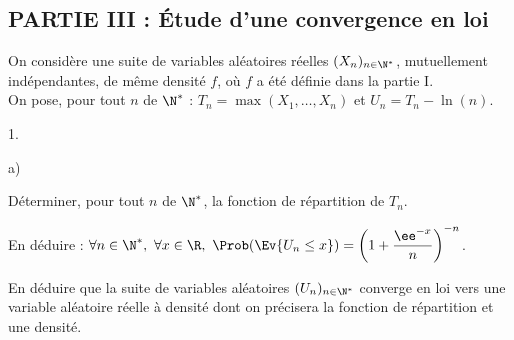 

\subsection*{PARTIE III : Étude d'une convergence en loi}

\noindent
On considère une suite de variables aléatoires réelles $(X_n)_{n\in
  \N^*}$, mutuellement indépendantes, de même densité $f$, où $f$ a
été définie dans la partie I.\\
On pose, pour tout $n$ de $\N^*$ : $T_n=\max(X_1,\ldots,X_n)$ et
$U_n=T_n-\ln(n)$.

\begin{noliste}{1.}
  \setlength{\itemsep}{4mm}
  \setcounter{enumi}{9}
\item
  \begin{noliste}{a)}
  \setlength{\itemsep}{2mm}
  \item Déterminer, pour tout $n$ de $\N^*$, la fonction de
    répartition de $T_n$.

    
    
  \item En déduire : $\forall n\in \N^*, \ \forall x\in \R, \
    \Prob(\Ev{U_n\leq x}) = \left(1 + \dfrac{\ee^{-x}}{n}
    \right)^{-n}$.
    
    
  \end{noliste}

\item En déduire que la suite de variables aléatoires
  $(U_n)_{n\in\N^*}$ converge en loi vers une variable aléatoire
  réelle à densité dont on précisera la fonction de répartition et une
  densité.



\end{noliste} 




